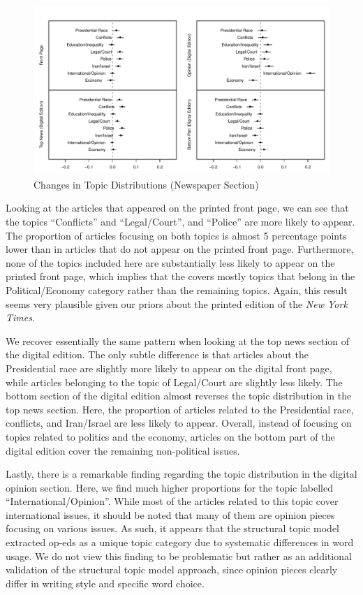 \documentclass[12pt]{article}
\begin{document}
\begin{doublespace}
\begin{figure}
\caption{Changes in Topic Distributions (Newspaper Section)}\label{fig:res_nyt_polecon}
\includegraphics[width=\textwidth]{../calc/fig/res_nyt_polecon}
\end{figure}

Looking at the articles that appeared on the printed front page, we can see that the topics ``Conflicts'' and ``Legal/Court'', and ``Police'' are more likely to appear. The proportion of articles focusing on both topics is almost 5 percentage points lower than in articles that do not appear on the printed front page. Furthermore, none of the topics included here are substantially less likely to appear on the printed front page, which implies that the covers mostly topics that belong in the Political/Economy category rather than the remaining topics. Again, this result seems very plausible given our priors about the printed edition of the \textit{New York Times}. 

We recover essentially the same pattern when looking at the top news section of the digital edition. The only subtle difference is that articles about the Presidential race are slightly more likely to appear on the digital front page, while articles belonging to the topic of Legal/Court are slightly less likely. The bottom section of the digital edition almost reverses the topic distribution in the top news section. Here, the proportion of articles related to the Presidential race, conflicts, and Iran/Israel are less likely to appear. Overall, instead of focusing on topics related to politics and the economy, articles on the bottom part of the digital edition cover the remaining non-political issues.

Lastly, there is a remarkable finding regarding the topic distribution in the digital opinion section. Here, we find much higher proportions for the topic labelled ``International/Opinion''. While most of the articles related to this topic cover international issues, it should be noted that many of them are opinion pieces focusing on various issues. As such, it appears that the structural topic model extracted op-eds as a unique topic category due to systematic differences in word usage. We do not view this finding to be problematic but rather as an additional validation of the structural topic model approach, since opinion pieces clearly differ in writing style and specific word choice.


\end{doublespace}
\end{document}
